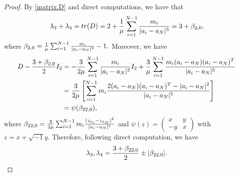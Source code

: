 \documentclass[11pt]{article}
\def\lb{\label}
\begin{document}
\begin{proof}
By \eqref{matrix.D} and direct computations, we have that 
\begin{align}\lb{eqn:sum.l3.l4}
  \lambda_3+\lambda_4 =tr(D)
  =2+{1\over\mu}\sum_{i=1}^{N-1}{m_i\over|a_i-a_N|^3} 
  =3+\beta_{2,0},
  \end{align}
where $\beta_{2,0}={1\over\mu}\sum_{i=1}^{N-1}{m_i\over|a_i-a_N|^3}-1.$
Moreover, we have
\begin{align}
  D-{3+\beta_{2,0}\over2}I_2
&=-{3\over2\mu}\sum_{i=1}^{N-1}{m_i\over|a_i-a_N|^3}I_2
 +{3\over\mu}\sum_{i=1}^{N-1}{m_i(a_i-a_N)(a_i-a_N)^T\over|a_i-a_N|^5}
 \\
&={3\over2\mu}\left[\sum_{i=1}^{N-1}m_i{2(a_i-a_N)(a_i-a_N)^T-|a_i-a_N|^2\over|a_i-a_N|^5}\right]\\
&=\psi(\beta_{22,0}),
\end{align}
where
$\beta_{22,0}={3\over2\mu}\sum_{i=1}^{N-1}m_i{(z_{a_i}-z_{a_N})^2\over|a_i-a_N|^5}$
and $\psi(z) = (\begin{smallmatrix}
  x & y\\-y & x
\end{smallmatrix})$ with $z = x+ \sqrt{-1} y$.
Therefore, following direct computation,
we have
\begin{align}\lb{eqn:l3l4}
  \lambda_3,\lambda_4={3+\beta_{22,0}\over2}\pm|\beta_{22,0}|.
\end{align}




\end{proof}
\end{document}
